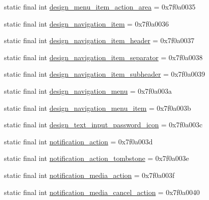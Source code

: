 \begin{DoxyCompactItemize}
\item 
static final int \mbox{\hyperlink{classandroid_1_1support_1_1design_1_1R_1_1layout_a892f94461e21ef2384016ac479728ada}{design\+\_\+menu\+\_\+item\+\_\+action\+\_\+area}} = 0x7f0a0035
\item 
static final int \mbox{\hyperlink{classandroid_1_1support_1_1design_1_1R_1_1layout_a6f870feafd3976058e65635845afdf28}{design\+\_\+navigation\+\_\+item}} = 0x7f0a0036
\item 
static final int \mbox{\hyperlink{classandroid_1_1support_1_1design_1_1R_1_1layout_ad5d1e4411a5d259439aaeb5d66ee87e4}{design\+\_\+navigation\+\_\+item\+\_\+header}} = 0x7f0a0037
\item 
static final int \mbox{\hyperlink{classandroid_1_1support_1_1design_1_1R_1_1layout_ad96876f67d154d3fd08794c12c1efc59}{design\+\_\+navigation\+\_\+item\+\_\+separator}} = 0x7f0a0038
\item 
static final int \mbox{\hyperlink{classandroid_1_1support_1_1design_1_1R_1_1layout_a3d4b46f5c32b100f48b1cf108d0f5b68}{design\+\_\+navigation\+\_\+item\+\_\+subheader}} = 0x7f0a0039
\item 
static final int \mbox{\hyperlink{classandroid_1_1support_1_1design_1_1R_1_1layout_a68f5d00d1b2b0dbca3b4c40fcc85bd25}{design\+\_\+navigation\+\_\+menu}} = 0x7f0a003a
\item 
static final int \mbox{\hyperlink{classandroid_1_1support_1_1design_1_1R_1_1layout_acd70ec67d761277f1107f9dd89bc96a3}{design\+\_\+navigation\+\_\+menu\+\_\+item}} = 0x7f0a003b
\item 
static final int \mbox{\hyperlink{classandroid_1_1support_1_1design_1_1R_1_1layout_ac329dd259163afccb61adabe0e1087c3}{design\+\_\+text\+\_\+input\+\_\+password\+\_\+icon}} = 0x7f0a003c
\item 
static final int \mbox{\hyperlink{classandroid_1_1support_1_1design_1_1R_1_1layout_a62682e26dd7458358a71436219e3b29d}{notification\+\_\+action}} = 0x7f0a003d
\item 
static final int \mbox{\hyperlink{classandroid_1_1support_1_1design_1_1R_1_1layout_ad1470d8708bc64b9fa90688c9ba2e8b8}{notification\+\_\+action\+\_\+tombstone}} = 0x7f0a003e
\item 
static final int \mbox{\hyperlink{classandroid_1_1support_1_1design_1_1R_1_1layout_ae4178499ed0a627b4082b09cfae99907}{notification\+\_\+media\+\_\+action}} = 0x7f0a003f
\item 
static final int \mbox{\hyperlink{classandroid_1_1support_1_1design_1_1R_1_1layout_a2afa4dd43d64918dd43e5c1b6ee43b97}{notification\+\_\+media\+\_\+cancel\+\_\+action}} = 0x7f0a0040

\end{DoxyCompactItemize}
